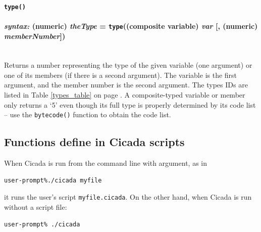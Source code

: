 \documentclass{article}
\newenvironment{code}{
       \begin{list}{}{
               \setlength{\leftmargin}{.4in}
               \setlength{\rightmargin}{0in}
               \setlength{\topsep}{.2in}
       }
       \small
       \item[] }
       { \end{list}   }
\begin{document}
 






\paragraph{\texttt{type()}\\\\
\normalfont \emph{syntax: } (numeric) \emph{theType} = \texttt{type}((composite variable) \emph{var} [, (numeric) \emph{memberNumber}])\\\\}

Returns a number representing the type of the given variable (one argument) or one of its members (if there is a second argument).  The variable is the first argument, and the member number is the second argument.  The types IDs are listed in Table \ref{types_table} on page \pageref{types_table}.  A composite-typed variable or member only returns a `5' even though its full type is properly determined by its code list -- use the \verb#bytecode()# function to obtain the code list.\\

 







\subsection{Functions define in Cicada scripts}  

When Cicada is run from the command line with argument, as in

\begin{code} \begin{verbatim}
user-prompt%./cicada myfile
\end{verbatim} \end{code}

\noindent it runs the user's script \verb#myfile.cicada#.  On the other hand, when Cicada is run without a script file:

\begin{code} \begin{verbatim}
user-prompt% ./cicada
\end{verbatim} \end{code}
\end{document}
